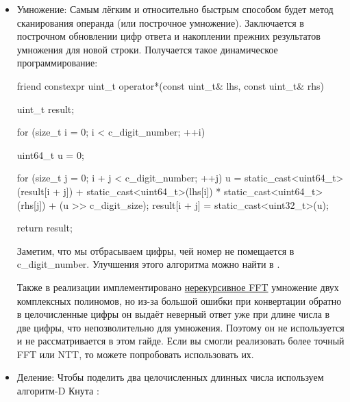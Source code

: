 \begin{itemize}
\begin{cppcode}
{    ++*this;
}
  \end{cppcode}
  Значит отрицанием будет:
  \begin{cppcode}
constexpr uint_t operator-() const {
    uint_t result = *this;
    result.negative();
    return result;
}
  \end{cppcode}
  Определяем внешние friend для вычитания:
  \begin{cppcode}
friend constexpr uint_t operator-(const uint_t& lhs, const uint_t& rhs) {
    uint_t result = lhs;
    result -= rhs;
    return result;
}

friend constexpr uint_t operator-(uint_t&& lhs, const uint_t& rhs) {
    lhs -= rhs;
    return lhs;
}

friend constexpr uint_t operator-(const uint_t& lhs, uint_t&& rhs) {
    rhs -= lhs;
    rhs.negative();
    return rhs;
}

friend constexpr uint_t operator-(uint_t&& lhs, uint_t&& rhs) {
    lhs -= rhs;
    return lhs;
}
  \end{cppcode}
  \item Умножение:
    Самым лёгким и относительно быстрым способом будет метод сканирования операнда (или построчное умножение). Заключается в построчном обновлении цифр ответа и накоплении прежних результатов умножения для новой строки. Получается такое динамическое программирование:
    \begin{cppcode}
friend constexpr uint_t operator*(const uint_t& lhs, const uint_t& rhs) {
    uint_t result;

    for (size_t i = 0; i < c_digit_number; ++i) {
        uint64_t u = 0;

        for (size_t j = 0; i + j < c_digit_number; ++j) {
            u = static_cast<uint64_t>(result[i + j])
              + static_cast<uint64_t>(lhs[i]) * static_cast<uint64_t>(rhs[j])
              + (u >> c_digit_size);
            result[i + j] = static_cast<uint32_t>(u);
        }
    }

    return result;
}
    \end{cppcode}
    Заметим, что мы отбрасываем цифры, чей номер не помещается в c\_digit\_number. Улучшения этого алгоритма можно найти в \cite{fast_mult}.

    Также в реализации имплементировано \href{https://neerc.ifmo.ru/trains/toulouse/2017/fft2.pdf}{нерекурсивное FFT} умножение двух комплексных полиномов, но из-за большой ошибки при конвертации обратно в целочисленные цифры он выдаёт неверный ответ уже при длине числа в две цифры, что непозволительно для умножения. Поэтому он не используется и не рассматривается в этом гайде. Если вы смогли реализовать более точный FFT или NTT, то можете попробовать использовать их.
  \item Деление:
    Чтобы поделить два целочисленных длинных числа используем алгоритм-D Кнута \cite{knuth2014art}:


\end{itemize}
